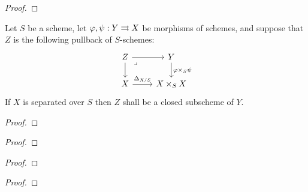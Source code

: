                     \begin{proof}
                        
                    \end{proof}
                \begin{proposition}
                    Let $S$ be a scheme, let $\varphi, \psi: Y \rightrightarrows X$ be morphisms of schemes, and suppose that $Z$ is the following pullback of $S$-schemes:
                        $$
                            \begin{tikzcd}
                            	Z & Y \\
                            	X & {X \x_S X}
                            	\arrow[from=1-1, to=2-1]
                            	\arrow["{\Delta_{X/S}}", from=2-1, to=2-2]
                            	\arrow[from=1-1, to=1-2]
                            	\arrow["{\varphi \x_S \psi}", from=1-2, to=2-2]
                            	\arrow["\lrcorner"{anchor=center, pos=0.125}, draw=none, from=1-1, to=2-2]
                            \end{tikzcd}
                        $$
                    If $X$ is separated over $S$ then $Z$ shall be a closed subscheme of $Y$. 
                \end{proposition}
                    \begin{proof}
                        
                    \end{proof}
                \begin{lemma} \label{lemma: topological_criterion_for_(quasi)_separatedness}
                    
                \end{lemma}
                    \begin{proof}
                        
                    \end{proof}
                \begin{lemma} \label{lemma: algebraic_criterion_for_(quasi)_separatedness}
                    
                \end{lemma}
                    \begin{proof}
                        
                    \end{proof}
                \begin{proposition} \label{prop: (quasi)_separatedness_and_quasi_compactness}
                    
                \end{proposition}
                    \begin{proof}
                        
                    \end{proof}
                
